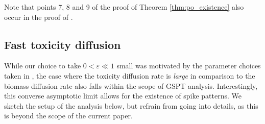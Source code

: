\documentclass[a4paper,10pt,abstract=true,parskip=true]{scrartcl}
\theoremstyle{remark}
\newtheorem{rmk}[thm]{Remark}
\numberwithin{equation}{section}
\numberwithin{thm}{section}
\newcommand{\eps}{\varepsilon}
\begin{document}
Note that points 7, 8 and 9 of the proof of Theorem \ref{thm:po_existence} also occur in the proof of \cite[Theorem 3.4]{NDV.2026}.



\subsection{Fast toxicity diffusion}
While our choice to take $0<\eps\ll1$ small was motivated by the parameter choices taken in \cite{GIS_2026}, the case where the toxicity diffusion rate is \emph{large} in comparison to the biomass diffusion rate also falls within the scope of GSPT analysis. Interestingly, this converse asymptotic limit allows for the existence of spike patterns. We sketch the setup of the analysis below, but refrain from going into details, as this is beyond the scope of the current paper.\\
\end{document}
